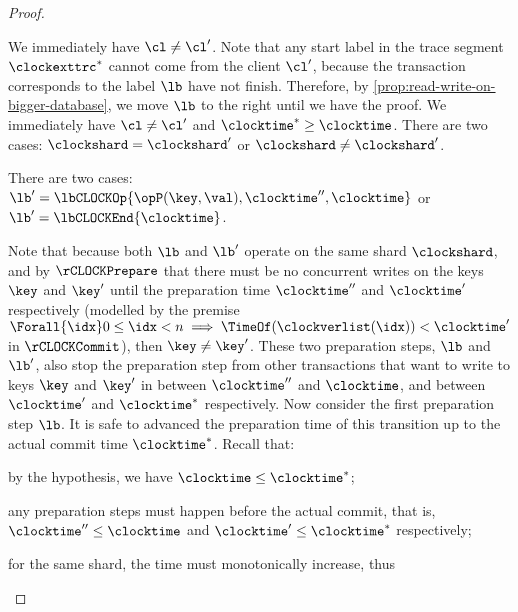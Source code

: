 \begin{proof}
\begin{enumerate}
We immediately have \( \cl \neq \cl' \).
Note that any start label in the trace segment \( \clockexttrc^*\) cannot come from the client \( \cl' \),
because the transaction corresponds to the label \( \lb \) have not finish.
Therefore, by \cref{prop:read-write-on-bigger-database}, we move \( \lb \) to the right until we have the proof.
    We immediately have \( \cl \neq \cl' \) and \( {\clocktime}^{*} \geq \clocktime \).
    There are two cases: \( \clockshard = \clockshard' \) or \( \clockshard \neq \clockshard' \).
    \begin{enumerate}
        There are two cases: \( \lb' = \lbCLOCKOp{\opP(\key,\val),\clocktime'', \clocktime} \) or \( \lb' = \lbCLOCKEnd{\clocktime} \).
        \begin{enumerate}
            Note that because both \(\lb \) and \( \lb' \) operate on the same shard \( \clockshard \),
            and by \( \rCLOCKPrepare \) that there must be no concurrent writes on the keys \( \key \) and \( \key' \)
            until the preparation time \( \clocktime'' \) and \( \clocktime' \) respectively
            (modelled by the premise 
            \( \Forall{\idx} 0 \leq \idx < n \implies \TimeOf(\clockverlist(\idx)) < \clocktime' \) in \( \rCLOCKCommit\)),
            then \( \key \neq \key'\).
            These two preparation steps, \( \lb \) and \( \lb' \), 
            also stop the preparation step from other transactions that want to write to
            keys \( \key \) and \( \key' \) in between \( \clocktime''\) and \( \clocktime \),
            and between \( \clocktime'\) and \( \clocktime^*\) respectively.
            Now consider the first preparation step \( \lb \).
            It is safe to advanced the preparation time of this transition up to the actual commit time \( \clocktime^* \).
            Recall that: \begin{enumerate*}
            \item by the hypothesis, we have \(\clocktime \leq \clocktime^*\);
            \item any preparation steps must happen before the actual commit, 
            that is, \( \clocktime'' \leq \clocktime\) and  \( \clocktime' \leq \clocktime^*\)
            respectively;
            \item for the same shard, the time must monotonically increase, thus

\end{enumerate*}
\end{enumerate}
\end{enumerate}
\end{enumerate}
\end{proof}
